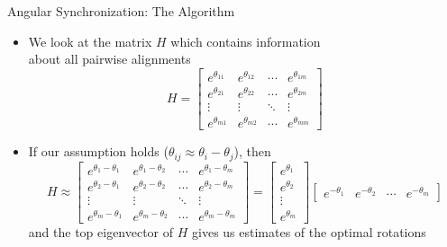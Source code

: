 \documentclass[10pt,aspectratio=169]{beamer}
\begin{document}
\begin{frame}{Angular Synchronization: The Algorithm}

\begin{itemize}
\item We look at the matrix $H$ which contains information \\about all pairwise alignments
$$H = \begin{bmatrix}
e^{\theta_{11}} & e^{\theta_{12}} & \cdots & e^{\theta_{1m}} \\
e^{\theta_{21}} & e^{\theta_{22}} & \cdots & e^{\theta_{2m}} \\
\vdots & \vdots & \ddots & \vdots \\
e^{\theta_{m1}} & e^{\theta_{m2}} & \cdots & e^{\theta_{mm}} 
\end{bmatrix} $$
\item If our assumption holds ($\theta_{ij} \approx \theta_i - \theta_j$), then 
$$ H \approx \begin{bmatrix}
e^{\theta_1-\theta_1} & e^{\theta_1-\theta_2} & \cdots & e^{\theta_1-\theta_m} \\
e^{\theta_2-\theta_1} & e^{\theta_2-\theta_2} & \cdots & e^{\theta_2-\theta_m} \\
\vdots & \vdots & \ddots & \vdots \\
e^{\theta_m-\theta_1} & e^{\theta_m-\theta_2} & \cdots & e^{\theta_m-\theta_m} 
\end{bmatrix} =
\begin{bmatrix}
e^{\theta_1} \\
e^{\theta_2} \\
\vdots \\
e^{\theta_m}
\end{bmatrix}
\begin{bmatrix}
e^{-\theta_1} & e^{-\theta_2} & \cdots & e^{-\theta_m}
\end{bmatrix} $$
and the top eigenvector of $H$ gives us estimates of the optimal rotations
\end{itemize}

\end{frame}
%
%
\end{document}
